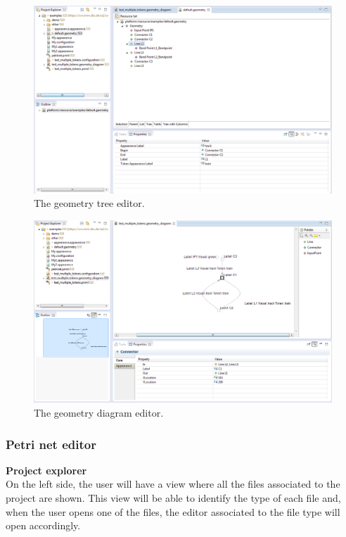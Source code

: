 \begin{figure}[H]
\begin{center}
\includegraphics[scale=0.45]{image/ui/geometry_tree.png}
\caption{The geometry tree editor.}
\label{fig:geometry_tree}
\end{center}
\end{figure}

\begin{figure}[H]
\begin{center}
\includegraphics[scale=0.45]{image/ui/geometry_diagram.png}
\caption{The geometry diagram editor.}
\label{fig:geometry_diagram}
\end{center}
\end{figure}

\subsubsection{Petri net editor}
\textbf{Project explorer} \\
On the left side, the user will have a view where all the files associated to the project are shown. This view will be able to identify the type of each file and, when the user opens one of the files, the editor associated to the file type will open accordingly. 

